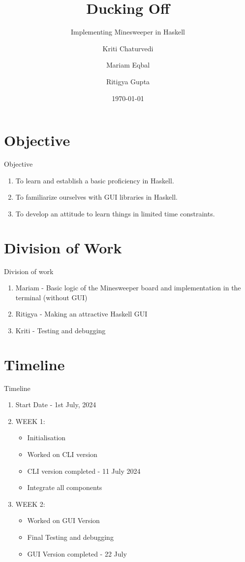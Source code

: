 \documentclass{beamer}
\title{Ducking Off}
\subtitle{Implementing Minesweeper in Haskell}
\author{Kriti Chaturvedi \and Mariam Eqbal \and Ritigya Gupta}
\date{\today}
\begin{document}
\begin{frame}
    \titlepage 
\end{frame}

\section{Objective}
\begin{frame}{Objective}
    \begin{enumerate}
        \item To learn and establish a basic proficiency in Haskell.
        \item To familiarize ourselves with GUI libraries in Haskell.
        \item To develop an attitude to learn things in limited time constraints.
    \end{enumerate}
\end{frame}

\section{Division of Work}
\begin{frame}{Division of work}
    \begin{enumerate}
        \item Mariam - Basic logic of the Minesweeper board and implementation in the terminal (without GUI)
        \item Ritigya - Making an attractive Haskell GUI
        \item Kriti - Testing and debugging 
    \end{enumerate}
    \end{frame}

\section{Timeline}
\begin{frame}{Timeline}
    \begin{enumerate}
        \item Start Date - 1st July, 2024
        \item WEEK 1: \begin{itemize}
            \item Initialisation 
            \item Worked on CLI version
            \item CLI version completed - 11 July 2024
            \item Integrate all components
          \end{itemize}
        
        
        \item WEEK 2: \begin{itemize}
            \item Worked on GUI Version
            \item Final Testing and debugging
            \item GUI Version completed - 22 July
          \end{itemize}
    \end{enumerate}
    \end{frame}
\end{document}
